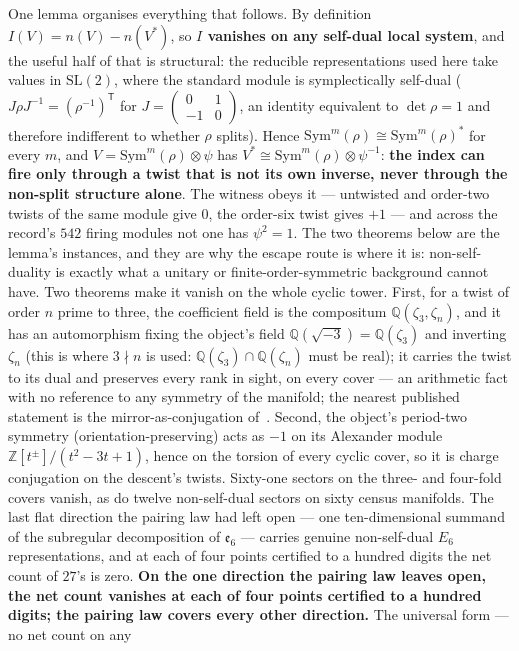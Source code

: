 \documentclass[11pt,a4paper]{article}
\theoremstyle{definition}
\theoremstyle{remark}
\newcommand{\Q}{\mathbb{Q}}
\newcommand{\Z}{\mathbb{Z}}
\begin{document}
One lemma organises everything that follows. By definition $I(V) = n(V) - n(V^*)$, so
\textbf{$I$ vanishes on any self-dual local system}, and the useful half of that is structural: the reducible
representations used here take values in $\mathrm{SL}(2)$, where the standard module is symplectically self-dual
($J\rho J^{-1} = (\rho^{-1})^{\mathsf T}$ for $J = \left(\begin{smallmatrix}0&1\\-1&0\end{smallmatrix}\right)$, an identity
equivalent to $\det\rho = 1$ and therefore indifferent to whether $\rho$ splits). Hence
$\mathrm{Sym}^m(\rho) \cong \mathrm{Sym}^m(\rho)^*$ for every $m$, and $V = \mathrm{Sym}^m(\rho)\otimes\psi$ has
$V^* \cong \mathrm{Sym}^m(\rho)\otimes\psi^{-1}$: \textbf{the index can fire only through a twist that is not its own
inverse, never through the non-split structure alone}. The witness obeys it --- untwisted and order-two twists of the same
module give $0$, the order-six twist gives $+1$ --- and across the record's $542$ firing modules not one has
$\psi^2 = 1$. The two theorems below are the lemma's instances, and they are why the escape route is where it is:
non-self-duality is exactly what a unitary or finite-order-symmetric background cannot have. Two theorems make it vanish on
the whole cyclic tower. First, for a twist of order $n$ prime to three, the coefficient field is the compositum $\Q(\zeta_3, \zeta_n)$, and it has an
automorphism fixing the object's field $\Q(\sqrt{-3}) = \Q(\zeta_3)$ and inverting $\zeta_n$ (this is where $3 \nmid n$ is
used: $\Q(\zeta_3) \cap \Q(\zeta_n)$ must be real); it carries the twist to its dual and preserves every rank in
sight, on every cover --- an arithmetic fact with no reference to any symmetry of the manifold;
the nearest published statement is the mirror-as-conjugation of~\cite{dfj}. Second, the object's period-two
symmetry (orientation-preserving) acts as $-1$ on its Alexander module $\Z[t^{\pm}]/(t^2 - 3t + 1)$, hence on the torsion of every cyclic
cover, so it is charge conjugation on the descent's twists. Sixty-one sectors on the three- and four-fold covers
vanish, as do twelve non-self-dual sectors on sixty census manifolds. The last flat direction the pairing law
had left open --- one ten-dimensional summand of the subregular decomposition of $\mathfrak{e}_6$ --- carries genuine
non-self-dual $E_6$ representations, and at each of four points certified to a hundred digits the net count of
$27$'s is zero. \textbf{On the one direction the pairing law leaves open, the net count vanishes at each of four points certified to a
hundred digits; the pairing law covers every other direction.} The universal form --- no net count on any
\end{document}
